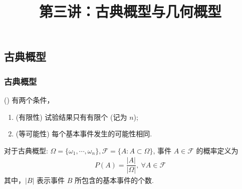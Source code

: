 \documentclass[Prob-All.tex]{subfiles}
\begin{document}
		\title[概率论]{第三讲：古典概型与几何概型}
	\date{}


	{ 
		\begin{frame}
			\titlepage
		\end{frame}
	}

\subsection{古典概型}
	\begin{frame}
		\frametitle{古典概型}
		\begin{defi}() 有两个条件，
			\begin{enumerate}[<+-|alert@+>][(1)]
				\item  (有限性) 试验结果只有有限个 (记为 $n$);
				\item (等可能性) 每个基本事件发生的可能性相同.
			\end{enumerate}

		\end{defi}

		\pause 对于古典概型: $\Omega=\{\omega_1,\cdots,\omega_n\}, \mathcal{F}=\{A:A\subset \Omega\}$, 事件 $A\in\mathcal{F}$ 的概率定义为
		\begin{eqnarray*}
			P(A)=\dfrac{|A|}{|\Omega|}, \ \forall A\in \mathcal{F}
		\end{eqnarray*}
		其中，$|B|$ 表示事件 $B$ 所包含的基本事件的个数.

	\end{frame}
\end{document}

